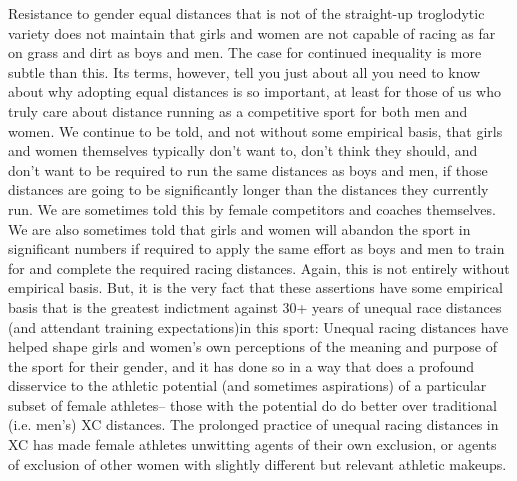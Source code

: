 Resistance to gender equal distances that is not of the straight-up troglodytic variety does not maintain that girls and women are not capable of racing as far on grass and dirt as boys and men. The case for continued inequality is more subtle than this. Its terms, however, tell you just about all you need to know about why adopting equal distances is so important, at least for those of us who truly care about distance running as a competitive sport for both men and women. We continue to be told, and not without some empirical basis, that girls and women themselves typically don't want to, don't think they should, and don't want to be required to run the same distances as boys and men, if those distances are going to be significantly longer than the distances they currently run. We are sometimes told this by female competitors and coaches themselves. We are also sometimes told that girls and women will abandon the sport in significant numbers if required to apply the same effort as boys and men to train for and complete the required racing distances. Again, this is not entirely without empirical basis. But, it is the very fact that these assertions have some empirical basis that is the greatest indictment against 30+ years of unequal race distances (and attendant training expectations)in this sport: Unequal racing distances have helped shape girls and women's own perceptions of the meaning and purpose of the sport for their gender, and it has done so in a way that does a profound disservice to the athletic potential (and sometimes aspirations) of a particular subset of female athletes-- those with the potential do do better over traditional (i.e. men's) XC distances. The prolonged practice of unequal racing distances in XC has made female athletes unwitting agents of their own exclusion, or agents of exclusion of other women with slightly different but relevant athletic makeups.

